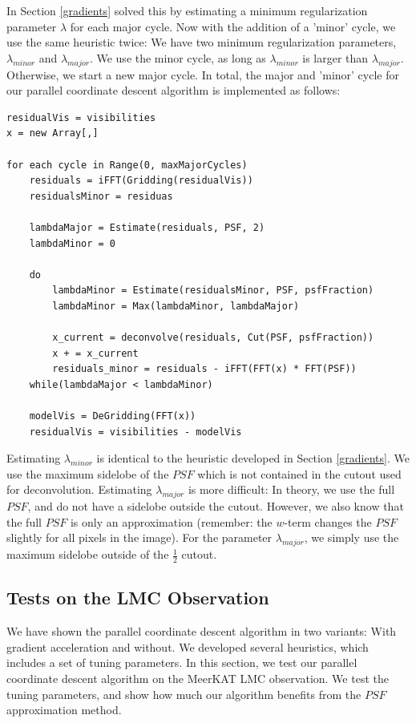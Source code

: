 In Section \ref{gradients} solved this by estimating a minimum regularization parameter $\lambda$ for each major cycle. Now with the addition of a 'minor' cycle, we use the same heuristic twice: We have two minimum regularization parameters, $\lambda_{minor}$ and $\lambda_{major}$. We use the minor cycle, as long as  $\lambda_{minor}$ is larger than  $\lambda_{major}$. Otherwise, we start a new major cycle. In total, the major and 'minor' cycle for our parallel coordinate descent algorithm is implemented as follows:

\begin{lstlisting}
residualVis = visibilities
x = new Array[,]

for each cycle in Range(0, maxMajorCycles)
	residuals = iFFT(Gridding(residualVis))
	residualsMinor = residuas
	
	lambdaMajor = Estimate(residuals, PSF, 2)
	lambdaMinor = 0
	
	do
		lambdaMinor = Estimate(residualsMinor, PSF, psfFraction)
		lambdaMinor = Max(lambdaMinor, lambdaMajor)
		
		x_current = deconvolve(residuals, Cut(PSF, psfFraction))
		x + = x_current
		residuals_minor = residuals - iFFT(FFT(x) * FFT(PSF))
	while(lambdaMajor < lambdaMinor)
	
	modelVis = DeGridding(FFT(x))
	residualVis = visibilities - modelVis
\end{lstlisting}

Estimating $\lambda_{minor}$ is identical to the heuristic developed in Section \ref{gradients}. We use the maximum sidelobe of the $PSF$ which is not contained in the cutout used for deconvolution. Estimating $\lambda_{major}$ is more difficult: In theory, we use the full $PSF$, and do not have a sidelobe outside the cutout. However, we also know that the full $PSF$ is only an approximation (remember: the $w$-term changes the $PSF$ slightly for all pixels in the image). For the parameter $\lambda_{major}$, we simply use the maximum sidelobe outside of the $\frac{1}{2}$ cutout.


\subsection{Tests on the LMC Observation}
We have shown the parallel coordinate descent algorithm in two variants: With gradient acceleration and without. We developed several heuristics, which includes a set of tuning parameters. In this section, we test our parallel coordinate descent algorithm on the MeerKAT LMC observation. We test the tuning parameters, and show how much our algorithm benefits from the $PSF$ approximation method.

